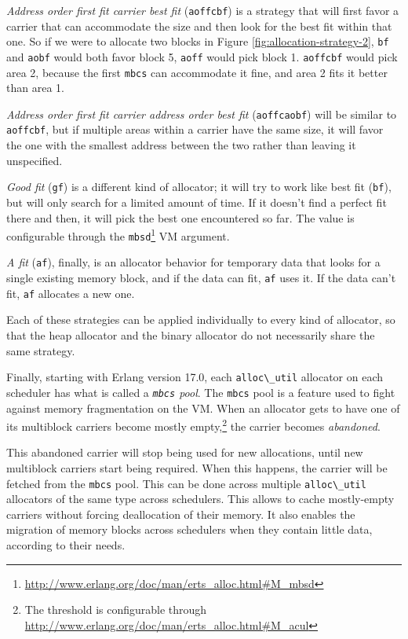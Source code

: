 \documentclass[11pt, oneside]{book}   	%
\newcommand{\term}[1]{\Verb`#1`}
\begin{document}
\emph{Address order first fit carrier best fit} (\term{aoffcbf}) is a strategy that will first favor a carrier that can accommodate the size and then look for the best fit within that one. So if we were to allocate two blocks in Figure \ref{fig:allocation-strategy-2}, \term{bf} and \term{aobf} would both favor block 5, \term{aoff} would pick block 1. \term{aoffcbf} would pick area 2, because the first \term{mbcs} can accommodate it fine, and area 2 fits it better than area 1.

\emph{Address order first fit carrier address order best fit} (\term{aoffcaobf}) will be similar to \term{aoffcbf}, but if multiple areas within a carrier have the same size, it will favor the one with the smallest address between the two rather than leaving it unspecified.

\emph{Good fit} (\term{gf}) is a different kind of allocator; it will try to work like best fit (\term{bf}), but will only search for a limited amount of time. If it doesn't find a perfect fit there and then, it will pick the best one encountered so far. The value is configurable through the \term{mbsd}\footnote{\href{http://www.erlang.org/doc/man/erts\_alloc.html\#M\_mbsd}{http://www.erlang.org/doc/man/erts\_alloc.html\#M\_mbsd}} VM argument.

\emph{A fit} (\term{af}), finally, is an allocator behavior for temporary data that looks for a single existing memory block, and if the data can fit, \term{af} uses it. If the data can't fit, \term{af} allocates a new one.

Each of these strategies can be applied individually to every kind of allocator, so that the heap allocator and the binary allocator do not necessarily share the same strategy.

Finally, starting with Erlang version 17.0, each \term{alloc\_util} allocator on each scheduler has what is called a \emph{\term{mbcs} pool}. The \term{mbcs} pool is a feature used to fight against memory fragmentation on the VM. When an allocator gets to have one of its multiblock carriers become mostly empty,\footnote{The threshold is configurable through \href{http://www.erlang.org/doc/man/erts\_alloc.html\#M\_acul}{http://www.erlang.org/doc/man/erts\_alloc.html\#M\_acul}} the carrier becomes \emph{abandoned}. 

This abandoned carrier will stop being used for new allocations, until new multiblock carriers start being required. When this happens, the carrier will be fetched from the \term{mbcs} pool. This can be done across multiple \term{alloc\_util} allocators of the same type across schedulers. This allows to cache mostly-empty carriers without forcing deallocation of their memory. It also enables the migration of memory blocks across schedulers when they contain little data, according to their needs.
\end{document}
